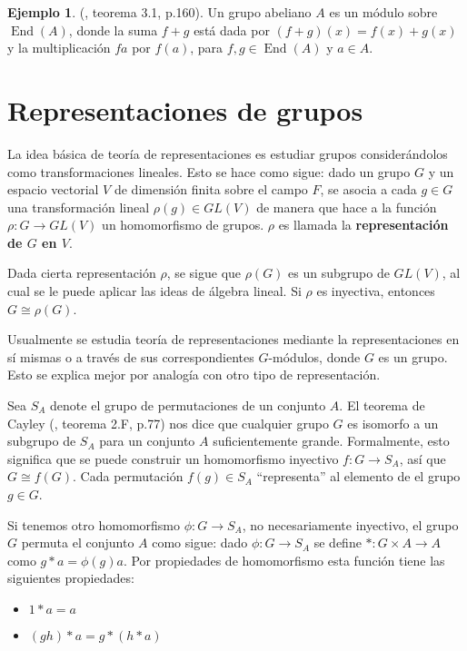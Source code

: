\documentclass[12pt]{book}
\theoremstyle{definition}
\newtheorem{example}[theorem]{Ejemplo}
\DeclareMathOperator{\End}{End}
\newcounter{in}
\newcounter{ini}
\begin{document}
\begin{example}{\normalfont (\cite{jacobson2012basic}, teorema 3.1, p.160).}
  Un grupo abeliano $A$ es un módulo sobre $\End(A)$, donde la suma
  $f+g$ está dada por $(f+g)(x)=f(x)+g(x)$ y la multiplicación $fa$
  por $f(a)$, para $f,g\in\End(A)$ y $a\in A$. 
\end{example}

\section{Representaciones de grupos}
\label{rep-grup}

La idea básica de teoría de representaciones es estudiar grupos considerándolos como
transformaciones lineales. Esto se hace como sigue: dado un grupo $G$
y un espacio vectorial $V$ de dimensión finita sobre el campo $F$,
se asocia a cada $g\in G$ una transformación lineal $\rho(g)\in GL(V)$ de manera que hace a la
función $\rho:G\rightarrow GL(V)$ un homomorfismo de grupos. $\rho$ es
llamada la \textbf{representación de
  $G$ en $V$}. 

Dada cierta representación $\rho$, se sigue que $\rho(G)$ es un
subgrupo de $GL(V)$, al cual se le puede aplicar las ideas de álgebra
lineal. Si $\rho$ es inyectiva, entonces $G\cong \rho(G)$.

Usualmente se estudia teoría de representaciones mediante la
representaciones en sí mismas o a través de sus correspondientes
$G$-módulos, donde $G$ es un grupo. Esto se explica mejor por analogía con otro tipo de representación.

Sea $S_{A}$ denote el grupo de permutaciones de un conjunto $A$. El
teorema de Cayley (\cite{herstein1990algebra}, teorema 2.F, p.77) nos dice que cualquier grupo $G$ es isomorfo a un
subgrupo de $S_{A}$ para un conjunto $A$ suficientemente
grande. Formalmente, esto significa que se puede construir un
homomorfismo inyectivo $f:G\rightarrow S_{A}$, así que $G\cong
f(G)$. Cada permutación $f(g)\in S_{A}$ ``representa'' al elemento de el grupo $g\in
G$. 

Si tenemos otro homomorfismo $\phi:G\rightarrow S_{A}$, no
necesariamente inyectivo, el grupo $G$ permuta el conjunto $A$ como sigue: dado
$\phi:G\rightarrow S_{A}$ se define $*:G\times A\rightarrow A$ como
$g*a=\phi(g)a$. Por propiedades de homomorfismo esta función tiene las
siguientes propiedades:
\begin{itemize}
\item $1*a=a$
\item $(gh)*a=g*(h*a)$
\end{itemize}
\end{document}

